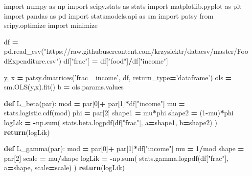 \documentclass[polish,]{book}
\newenvironment{Shaded}{\begin{snugshade}}{\end{snugshade}}
\newcommand{\BuiltInTok}[1]{#1}
\newcommand{\ControlFlowTok}[1]{\textcolor[rgb]{0.13,0.29,0.53}{\textbf{#1}}}
\newcommand{\DecValTok}[1]{\textcolor[rgb]{0.00,0.00,0.81}{#1}}
\newcommand{\ImportTok}[1]{#1}
\newcommand{\KeywordTok}[1]{\textcolor[rgb]{0.13,0.29,0.53}{\textbf{#1}}}
\newcommand{\NormalTok}[1]{#1}
\newcommand{\OperatorTok}[1]{\textcolor[rgb]{0.81,0.36,0.00}{\textbf{#1}}}
\newcommand{\StringTok}[1]{\textcolor[rgb]{0.31,0.60,0.02}{#1}}
\begin{document}
\begin{Shaded}
\begin{Highlighting}[]
\ImportTok{import}\NormalTok{ numpy }\ImportTok{as}\NormalTok{ np}
\ImportTok{import}\NormalTok{ scipy.stats }\ImportTok{as}\NormalTok{ stats}
\ImportTok{import}\NormalTok{ matplotlib.pyplot }\ImportTok{as}\NormalTok{ plt}
\ImportTok{import}\NormalTok{ pandas }\ImportTok{as}\NormalTok{ pd}
\ImportTok{import}\NormalTok{ statsmodels.api }\ImportTok{as}\NormalTok{ sm}
\ImportTok{import}\NormalTok{ patsy}
\ImportTok{from}\NormalTok{ scipy.optimize }\ImportTok{import}\NormalTok{ minimize}

\NormalTok{df }\OperatorTok{=}\NormalTok{ pd.read_csv(}\StringTok{"https://raw.githubusercontent.com/krzysiektr/datacsv/master/FoodExpenditure.csv"}\NormalTok{)}
\NormalTok{df[}\StringTok{"frac"}\NormalTok{] }\OperatorTok{=}\NormalTok{ df[}\StringTok{"food"}\NormalTok{]}\OperatorTok{/}\NormalTok{df[}\StringTok{"income"}\NormalTok{]}

\NormalTok{y, x }\OperatorTok{=}\NormalTok{ patsy.dmatrices(}\StringTok{'frac ~ income'}\NormalTok{, df, return_type}\OperatorTok{=}\StringTok{'dataframe'}\NormalTok{)}
\NormalTok{ols }\OperatorTok{=}\NormalTok{ sm.OLS(y,x).fit()}
\NormalTok{b }\OperatorTok{=}\NormalTok{ ols.params.values}

\KeywordTok{def}\NormalTok{ L_beta(par):}
\NormalTok{    mod }\OperatorTok{=}\NormalTok{ par[}\DecValTok{0}\NormalTok{]}\OperatorTok{+}\NormalTok{ par[}\DecValTok{1}\NormalTok{]}\OperatorTok{*}\NormalTok{df[}\StringTok{"income"}\NormalTok{]}
\NormalTok{    mu }\OperatorTok{=}\NormalTok{ stats.logistic.cdf(mod)}
\NormalTok{    phi }\OperatorTok{=}\NormalTok{ par[}\DecValTok{2}\NormalTok{]}
\NormalTok{    shape1 }\OperatorTok{=}\NormalTok{ mu}\OperatorTok{*}\NormalTok{phi}
\NormalTok{    shape2 }\OperatorTok{=}\NormalTok{ (}\DecValTok{1}\OperatorTok{-}\NormalTok{mu)}\OperatorTok{*}\NormalTok{phi}
\NormalTok{    logLik }\OperatorTok{=} \OperatorTok{-}\NormalTok{np.}\BuiltInTok{sum}\NormalTok{( stats.beta.logpdf(df[}\StringTok{"frac"}\NormalTok{], a}\OperatorTok{=}\NormalTok{shape1, b}\OperatorTok{=}\NormalTok{shape2) )}
    \ControlFlowTok{return}\NormalTok{(logLik)}

\KeywordTok{def}\NormalTok{ L_gamma(par):}
\NormalTok{    mod }\OperatorTok{=}\NormalTok{ par[}\DecValTok{0}\NormalTok{]}\OperatorTok{+}\NormalTok{ par[}\DecValTok{1}\NormalTok{]}\OperatorTok{*}\NormalTok{df[}\StringTok{"income"}\NormalTok{]}
\NormalTok{    mu }\OperatorTok{=} \DecValTok{1}\OperatorTok{/}\NormalTok{mod}
\NormalTok{    shape }\OperatorTok{=}\NormalTok{ par[}\DecValTok{2}\NormalTok{]}
\NormalTok{    scale }\OperatorTok{=}\NormalTok{ mu}\OperatorTok{/}\NormalTok{shape}
\NormalTok{    logLik }\OperatorTok{=} \OperatorTok{-}\NormalTok{np.}\BuiltInTok{sum}\NormalTok{( stats.gamma.logpdf(df[}\StringTok{"frac"}\NormalTok{], a}\OperatorTok{=}\NormalTok{shape, scale}\OperatorTok{=}\NormalTok{scale) )}
    \ControlFlowTok{return}\NormalTok{(logLik)}


\end{Highlighting}
\end{Shaded}
\end{document}
